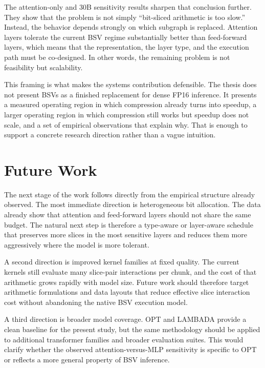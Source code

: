 The attention-only and 30B sensitivity results sharpen that conclusion further. They show that the problem is not simply ``bit-sliced arithmetic is too slow.'' Instead, the behavior depends strongly on which subgraph is replaced. Attention layers tolerate the current BSV regime substantially better than feed-forward layers, which means that the representation, the layer type, and the execution path must be co-designed. In other words, the remaining problem is not feasibility but scalability.

This framing is what makes the systems contribution defensible. The thesis does not present BSVs as a finished replacement for dense FP16 inference. It presents a measured operating region in which compression already turns into speedup, a larger operating region in which compression still works but speedup does not scale, and a set of empirical observations that explain why. That is enough to support a concrete research direction rather than a vague intuition.

\section{Future Work}\label{sec:future-work}
The next stage of the work follows directly from the empirical structure already observed. The most immediate direction is heterogeneous bit allocation. The data already show that attention and feed-forward layers should not share the same budget. The natural next step is therefore a type-aware or layer-aware schedule that preserves more slices in the most sensitive layers and reduces them more aggressively where the model is more tolerant.

A second direction is improved kernel families at fixed quality. The current kernels still evaluate many slice-pair interactions per chunk, and the cost of that arithmetic grows rapidly with model size. Future work should therefore target arithmetic formulations and data layouts that reduce effective slice interaction cost without abandoning the native BSV execution model.

A third direction is broader model coverage. OPT and LAMBADA provide a clean baseline for the present study, but the same methodology should be applied to additional transformer families and broader evaluation suites. This would clarify whether the observed attention-versus-MLP sensitivity is specific to OPT or reflects a more general property of BSV inference.

